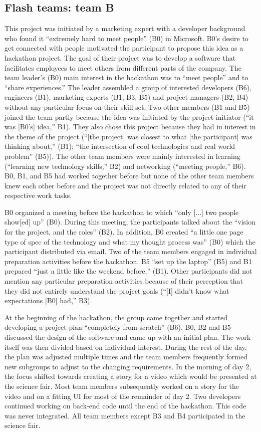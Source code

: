\documentclass{hcij}
\begin{document}
\subsection{Flash teams: team B}
This project was initiated by a marketing expert with a developer background who found it “extremely hard to meet people” (B0) in Microsoft. B0’s desire to get connected with people motivated the participant to propose this idea as a hackathon project. The goal of their project was to develop a software that facilitates employees to meet others from different parts of the company. The team leader’s (B0) main interest in the hackathon was to “meet people” and to “share experiences.” The leader assembled a group of interested developers (B6), engineers (B1), marketing experts (B1, B3, B5) and project managers (B2, B4) without any particular focus on their skill set. Two other members (B1 and B5) joined the team partly because the idea was initiated by the project initiator (“it was [B0’s] idea,” B1). They also chose this project because they had in interest in the theme of the project (“[the project] was closest to what [the participant] was thinking about,” (B1); “the intersection of cool technologies and real world problem” (B5)). The other team members were mainly interested in learning (“learning new technology skills,” B2) and networking (“meeting people,” B6). B0, B1, and B5 had worked together before but none of the other team members knew each other before and the project was not directly related to any of their respective work tasks.

B0 organized a meeting before the hackathon to which “only [...] two people show[ed] up” (B0). During this meeting, the participants talked about the “vision for the project, and the roles” (B2). In addition, B0 created “a little one page type of spec of the technology and what my thought process was” (B0) which the participant distributed via email. Two of the team members engaged in individual preparation activities before the hackathon. B5 “set up the laptop” (B5) and B1 prepared “just a little like the weekend before,” (B1). Other participants did not mention any particular preparation activities because of their perception that they did not entirely understand the project goals (“[I] didn’t know what expectations [B0] had,” B3).

At the beginning of the hackathon, the group came together and started developing a project plan “completely from scratch” (B6). B0, B2 and B5 discussed the design of the software and came up with an initial plan. The work itself was then divided based on individual interest. During the rest of the day, the plan was adjusted multiple times and the team members frequently formed new subgroups to adjust to the changing requirements. In the morning of day 2, the focus shifted towards creating a story for a video which would be presented at the science fair. Most team members subsequently worked on a story for the video and on a fitting UI for most of the remainder of day 2. Two developers continued working on back-end code until the end of the hackathon. This code was never integrated. All team members except B3 and B4 participated in the science fair.
\end{document}
